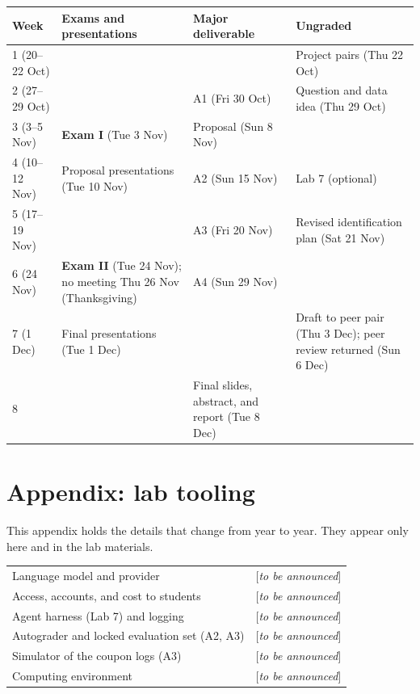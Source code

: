 \documentclass[11pt]{article}
\newcommand{\tbd}[1]{\textcolor{warnred}{[\emph{#1}]}}
\begin{document}
\begin{center}
\small
\begin{tabular}{L{2.4cm}L{4.4cm}L{3.6cm}L{4.4cm}}
\toprule
\textbf{Week} & \textbf{Exams and presentations} & \textbf{Major deliverable} & \textbf{Ungraded} \\
 (20--22 Oct) & & & Project pairs (Thu 22 Oct) \\
2 (27--29 Oct) & & A1 (Fri 30 Oct) & Question and data idea (Thu 29 Oct) \\
3 (3--5 Nov) & \textbf{Exam I} (Tue 3 Nov) & Proposal (Sun 8 Nov) & \\
4 (10--12 Nov) & Proposal presentations (Tue 10 Nov) & A2 (Sun 15 Nov) & Lab 7 (optional) \\
5 (17--19 Nov) & & A3 (Fri 20 Nov) & Revised identification plan (Sat 21 Nov) \\
6 (24 Nov) & \textbf{Exam II} (Tue 24 Nov); no meeting Thu 26 Nov (Thanksgiving) & A4 (Sun 29 Nov) & \\
7 (1 Dec) & Final presentations (Tue 1 Dec) & & Draft to peer pair (Thu 3 Dec); peer review returned (Sun 6 Dec) \\
8 & & Final slides, abstract, and report (Tue 8 Dec) & \\
\bottomrule
\end{tabular}
\end{center}

\appendix
\section*{Appendix: lab tooling}

This appendix holds the details that change from year to year. They appear only here and in the lab
materials.

\begin{center}
\small
\begin{tabular}{L{5cm}L{9.5cm}}
\toprule
Language model and provider & \tbd{to be announced} \\
Access, accounts, and cost to students & \tbd{to be announced} \\
Agent harness (Lab 7) and logging & \tbd{to be announced} \\
Autograder and locked evaluation set (A2, A3) & \tbd{to be announced} \\
Simulator of the coupon logs (A3) & \tbd{to be announced} \\
Computing environment & \tbd{to be announced} \\
\bottomrule
\end{tabular}
\end{center}
\end{document}
